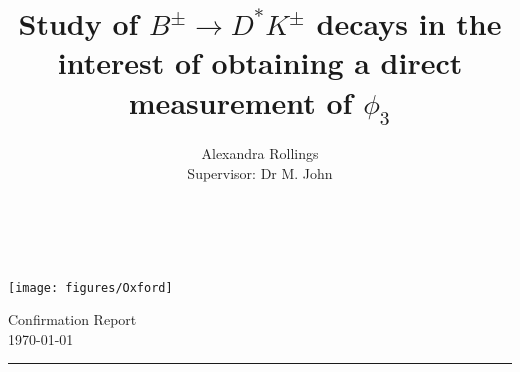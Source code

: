 \documentclass[oneside,12pt]{article}
\title{ \LARGE \textbf{Study of $B^{\pm} \rightarrow D^{*}K^{\pm}$ decays in the
interest of obtaining a direct measurement of $\phi_3$} \\ }
\author{
		Alexandra Rollings\\	
		Supervisor: Dr M. John\\	
}
\makeatletter
\newcommand{\HRule}[1]{\rule{\linewidth}{#1}}     %
\def\printtitle{%
  {\centering \@title\par}}
\def\printauthor{%
  {\centering \large \@author}}
\makeatother
\begin{document}
\begin{titlepage}
\begin{nolinenumbers}
\thispagestyle{empty} 

\begin{minipage}[c]{.15\linewidth}
  \texttt{[image: figures/Oxford]}
\end{minipage}\hfill
\begin{minipage}[c]{.75\linewidth}
  \begin{flushright}
  \normalsize {Confirmation Report} 	%
  \\ \normalsize \today			%
  \end{flushright}
\end{minipage}



\HRule{0.5pt} \\						%
[2.0cm]
\printtitle 
\vspace{75pt}
\printauthor
\vfill
\begin{abstract}
\noindent
\\
\end{abstract}
\vfill
\end{nolinenumbers}
\end{titlepage}
\setcounter{page}{1}
\end{document}
